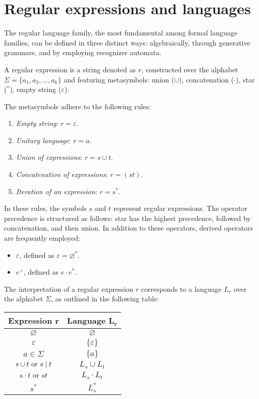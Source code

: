 \section{Regular expressions and languages}

The regular language family, the most fundamental among formal language families, can be defined in three distinct ways: algebraically, through generative grammars, and by employing recognizer automata.
\begin{definition}
    A regular expression is a string denoted as $r$, constructed over the alphabet $\Sigma=\{a_1,a_2,\dots,a_k\}$ and featuring metasymbols: union ($\cup$), concatenation ($\cdot$), star ($^{\ast}$), empty string ($\varepsilon$). 
\end{definition}
The metasymbols adhere to the following rules:
\begin{enumerate}
    \item \textit{Empty string}: $r=\varepsilon$.
    \item \textit{Unitary language}: $r=a$.
    \item \textit{Union of expressions}: $r=s \cup t$.
    \item \textit{Concatenation of expressions}: $r=(st)$.
    \item \textit{Iteration of an expression}: $r=s^{\ast}$. 
\end{enumerate}
In these rules, the symbols $s$ and $t$ represent regular expressions. 
The operator precedence is structured as follows: star has the highest precedence, followed by concatenation, and then union.
In addition to these operators, derived operators are frequently employed:
\begin{itemize}
    \item $\varepsilon$, defined as $\varepsilon=\varnothing^{\ast}$. 
    \item $e^{+}$, defined as $e \cdot e^{\ast}$. 
\end{itemize}
The interpretation of a regular expression $r$ corresponds to a language $L_r$ over the alphabet $\Sigma$, as outlined in the following table:
\begin{table}[H]
    \centering
    \begin{tabular}{cc}
    \hline
    \textbf{Expression $\boldsymbol{r}$} & \textbf{Language $\boldsymbol{L_r}$} \\ \hline
    $\varnothing$                        & $\varnothing$                        \\
    $\varepsilon$                        & $\{\varepsilon\}$                    \\
    $a \in \Sigma$                       & $\{a\}$                              \\
    $s \cup t \textnormal{ or } s\mid t$     & $L_s \cup L_t$                       \\
    $s \cdot t \textnormal{ or } st$     & $L_s \cdot L_t$                      \\
    $s^{\ast}$                              & $L_s^{\ast}$                            \\ \hline
    \end{tabular}
\end{table}
